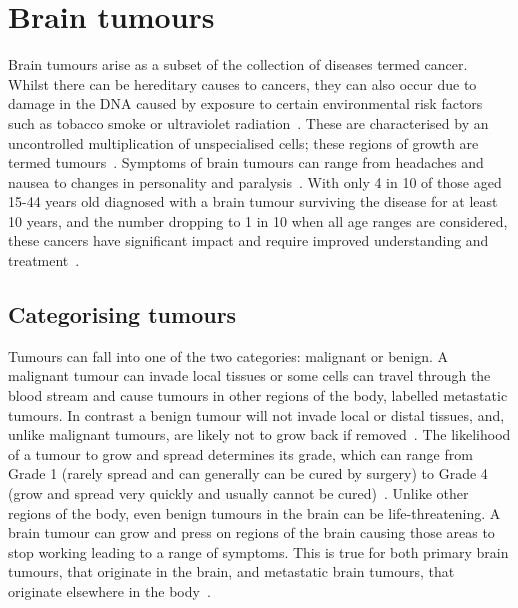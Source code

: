 \section{Brain tumours}
Brain tumours arise as a subset of the collection of diseases termed cancer. Whilst there can be hereditary causes to cancers, they can also occur due to damage in the DNA caused by exposure to certain environmental risk factors such as tobacco smoke or ultraviolet radiation~\cite{WorldHealthOrganisation2023}. These are characterised by an uncontrolled multiplication of unspecialised cells; these regions of growth are termed tumours~\cite{WorldHealthOrganisation2023}. Symptoms of brain tumours can range from headaches and nausea to changes in personality and paralysis~\cite{NationalHealthService2023}. With only 4 in 10 of those aged 15-44 years old diagnosed with a brain tumour surviving the disease for at least 10 years, and the number dropping to 1 in 10 when all age ranges are considered, these cancers have significant impact and require improved understanding and treatment~\cite{CancerResearchUK2023}.

\subsection{Categorising tumours} 
Tumours can fall into one of the two categories: malignant or benign. A malignant tumour can invade local tissues or some cells can travel through the blood stream and cause tumours in other regions of the body, labelled metastatic tumours. In contrast a benign tumour will not invade local or distal tissues, and, unlike malignant tumours, are likely not to grow back if removed~\cite{Institute2021}. The likelihood of a tumour to grow and spread determines its grade, which can range from Grade 1 (rarely spread and can generally can be cured by surgery) to Grade 4 (grow and spread very quickly and usually cannot be cured)~\cite{Institute2023}. Unlike other regions of the body, even benign tumours in the brain can be life-threatening. A brain tumour can grow and press on regions of the brain causing those areas to stop working leading to a range of symptoms. This is true for both primary brain tumours, that originate in the brain, and metastatic brain tumours, that originate elsewhere in the body~\cite{Institute2021}.

